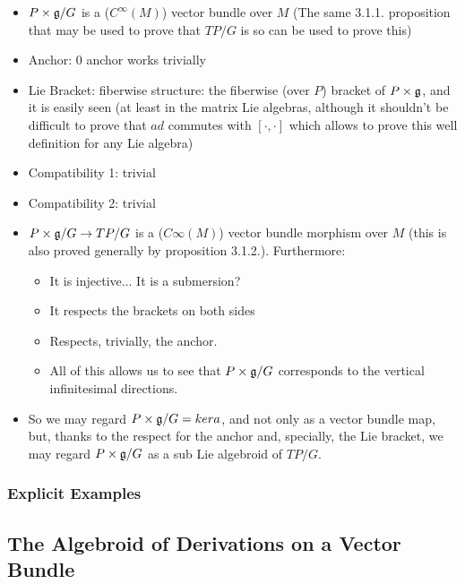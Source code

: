     \begin{itemize}
    \item $P \times \mathfrak{g}/G$ is a ($C^\infty(M)$) vector bundle over $M$ (The same 3.1.1. proposition that may be used to prove that $TP/G$ is so can be used to prove this)
    
    \item Anchor: $0$ anchor works trivially
    
    \item Lie Bracket: fiberwise structure: the fiberwise (over $P$) bracket of $P \times \mathfrak{g}$, and it is easily seen (at least in the matrix Lie algebras, although it shouldn't be difficult to prove that $ad$ commutes with $[\cdot , \cdot]$ which allows to prove this well definition for any Lie algebra)
    
    \item Compatibility 1: trivial
    
    \item Compatibility 2: trivial
    
    \item $P \times \mathfrak{g}/ G \to TP / G$ is a ($C\infty(M)$) vector bundle morphism over $M$ (this is also proved generally by proposition 3.1.2.). Furthermore:
        \begin{itemize}
        \item It is injective... It is a submersion?
        \item It respects the brackets on both sides
        \item Respects, trivially, the anchor.
        \item All of this allows us to see that $P \times \mathfrak{g}/G$ corresponds to the vertical infinitesimal directions.
        \end{itemize}
    
    \item So we may regard $P \times \mathfrak{g} / G = ker a$, and not only as a vector bundle map, but, thanks to the respect for the anchor and, specially, the Lie bracket, we may regard $P \times \mathfrak{g}/G$ as a sub Lie algebroid of $TP/G$.
    \end{itemize}

\subsubsection{Explicit Examples}

\subsection{The Algebroid of Derivations on a Vector Bundle}

